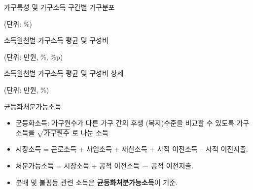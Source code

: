 \documentclass[aspectratio=169,xcolor=dvipsnames,handout]{beamer}
\begin{document}
\begin{frame}{가구특성 및 가구소득 구간별 가구분포}
    \begin{table}
        \raggedleft\relax
        \tiny{(단위: \%)}
        \hspace*{2em}
        \\
        \centering
        \resizebox{.95\textwidth}{!}{\relax
           
        }
       \caption{가구특성 및 가구소득 구간별 가구분포} 
    \end{table}
\end{frame}

\begin{frame}{소득원천별 가구소득 평균 및 구성비}
    \begin{table}
        \raggedleft\relax
        \tiny{(단위: 만원, \%, \%p)}
        \hspace*{2em}
        \\
        \centering
        \resizebox{.95\textwidth}{!}{\relax
           
        }
       \caption{소득원천별 가구소득 평균 및 구성비}
    \end{table}
\end{frame}

\begin{frame}{소득원천별 가구소득 평균 및 구성비 상세}
    \begin{table}
        \raggedleft\relax
        \tiny{(단위: 만원, \%)}
        \hspace*{2em}
        \\
        \centering
        \resizebox{.95\textwidth}{!}{\relax
           
        }
       \caption{소득원천별 가구소득 평균 및 구성비 상세}
    \end{table}
\end{frame}

\begin{frame}{균등화처분가능소득}
    \begin{itemize}
        \item 균등화소득:  가구원수가 다른 가구 간의 후생 (복지)수준을 비교할 수 있도록 가구소득을 $\sqrt{\text{가구원수}}$ 로 나눈 소득
        \item 시장소득 = 근로소득 + 사업소득 + 재산소득 + 사적 이전소득 – 사적 이전지출.
        \item 처분가능소득 = 시장소득 + 공적 이전소득 － 공적 이전지출.
        \item 분배 및 불평등 관련 소득은 \textbf{균등화처분가능소득}이 기준.
    \end{itemize}
\end{frame}
\end{document}
